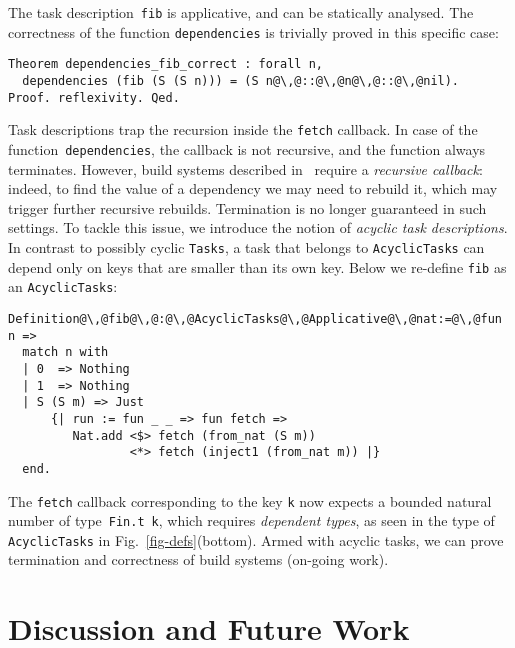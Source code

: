 \documentclass[sigplan,review]{acmart}\settopmatter{printfolios=true,printccs=false,printacmref=false}
\newcommand{\hs}{\texttt}
\newcommand{\coq}{\texttt}
\begin{document}
The task description~\hs{fib} is applicative, and can be statically analysed.
The correctness of the function \hs{dependencies} is trivially proved in this
specific case:

\vspace{-1mm}
\begin{verbatim}
Theorem dependencies_fib_correct : forall n,
  dependencies (fib (S (S n))) = (S n@\,@::@\,@n@\,@::@\,@nil).
Proof. reflexivity. Qed.
\end{verbatim}
\vspace{-1mm}

Task descriptions trap the recursion inside the \hs{fetch} callback. In case of
the function~\hs{dependencies}, the callback is not recursive, and the function
always terminates. However, build systems described in~\cite{Mokhov2018icfp}
require a \emph{recursive callback}: indeed, to find the value of a dependency we
may need to rebuild it, which may trigger further recursive rebuilds.
Termination is no longer guaranteed in such settings. To tackle this issue, we
introduce the notion of \emph{acyclic task descriptions}. In contrast to
possibly cyclic \hs{Tasks}, a task that belongs to \hs{AcyclicTasks}
can depend only on keys that are smaller than its own key. Below we re-define
\hs{fib} as an \hs{AcyclicTasks}:

\vspace{-1mm}
\begin{verbatim}
Definition@\,@fib@\,@:@\,@AcyclicTasks@\,@Applicative@\,@nat:=@\,@fun n =>
  match n with
  | 0  => Nothing
  | 1  => Nothing
  | S (S m) => Just
      {| run := fun _ _ => fun fetch =>
         Nat.add <$> fetch (from_nat (S m))
                 <*> fetch (inject1 (from_nat m)) |}
  end.
\end{verbatim}
\vspace{-1mm}

\noindent
The \hs{fetch} callback corresponding to the key \hs{k} now expects a bounded
natural number of type~\hs{Fin.t}~\hs{k}, which requires \emph{dependent types},
as seen in the type of \hs{AcyclicTasks} in Fig.~\ref{fig-defs}(bottom). Armed
with acyclic tasks, we can prove termination and correctness of build systems
(on-going work).


\vspace{-2mm}
\section{Discussion and Future Work}\label{sec-discussion}
\vspace{-1mm}
\end{document}
